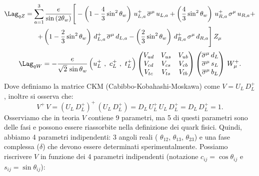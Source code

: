 \begin{multline}
    \Lag_{qZ} = \sum_{a=1}^3\frac{e}{\sin{\left(2\theta_w\right)}}\Bigg[ -\left( 1 - \frac{4}{3}\sin^2{\theta_w} \right)\, u_{L,a}^+\, \overline{\sigma}^\mu\, u_{L,a} + \left( \frac{4}{3}\sin^2{\theta_w} \right)\, u_{R,a}^+\, \sigma^\mu\, u_{R,a} + \\
    + \left( 1 - \frac{2}{3}\sin^2{\theta_w} \right)\, d_{L,a}^+\, \overline{\sigma}^\mu\, d_{L,a} - \left( \frac{2}{3}\sin^2{\theta_w} \right)\, d_{R,a}^+\, \sigma^\mu\, d_{R,a} \Bigg]\, Z_\mu
\end{multline}
\begin{multline}
    \Lag_{qW} = -\frac{e}{\sqrt{2}\, \sin{\theta_w}}\, \Big( u_L^+\ , \ c_L^+ \ , \ t_L^+ \Big)\begin{pmatrix}
        V_{ud} & V_{us} & V_{ub} \\
        V_{cd} & V_{cs} & V_{cb} \\
        V_{tc} & V_{ts} & V_{tb}
    \end{pmatrix}\begin{pmatrix}
        \overline{\sigma}^\mu\, d_L \\
        \overline{\sigma}^\mu\, s_L \\
        \overline{\sigma}^\mu\, b_L
    \end{pmatrix}\, W_\mu^+.
\end{multline}
Dove definiamo la matrice CKM (Cabibbo-Kobahashi-Moskawa) come $V = U_L\, D_L^+$, inoltre si osserva che:
\begin{equation}
    V^+\, V = \left(U_L\, D_L^+\right)^+\, \left(U_L\, D_L^+\right) = D_L\, U_L^+\, U_L\, D_L^+ = D_L\, D_L^+ = 1.
\end{equation}
Osserviamo che in teoria $V$ contiene 9 parametri, ma 5 di questi parametri sono delle fasi e possono essere riassorbite nella definizione dei quark fisici. Quindi, abbiamo 4 parametri indipendenti: 3 angoli reali ( $\theta_{12}$, $\theta_{13}$, $\theta_{23}$) e una fase complessa ($\delta$) che devono essere determinati sperimentalmente. Possiamo riscrivere $V$ in funzione dei 4 parametri indipendenti (notazione $c_{ij}=\cos\theta_{ij}$ e $s_{ij}=\sin\theta_{ij}$):
